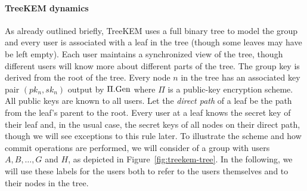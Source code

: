 \paragraph{TreeKEM dynamics}

As already outlined briefly, TreeKEM uses a full binary tree to model the group and every user is associated with a leaf in the tree (though some leaves may have be left empty). Each user maintains a synchronized view of the tree, though different users will know more about different parts of the tree. The group key is derived from the root of the tree. Every node $n$ in the tree has an associated key pair $(pk_n, sk_n)$ output by $\Pi.\mathrm{Gen}$ where $\Pi$ is a public-key encryption scheme. All public keys are known to all users. Let the \emph{direct path} of a leaf be the path from the leaf's parent to the root. Every user at a leaf knows the secret key of their leaf and, in the usual case, the secret keys of all nodes on their direct path, though we will see exceptions to this rule later. To illustrate the scheme and how commit operations are performed, we will consider of a group with users $A, B, \ldots, G$ and $H$, as depicted in Figure~\ref{fig:treekem-tree}. In the following, we will use these labels for the users both to refer to the users themselves and to their nodes in the tree.

